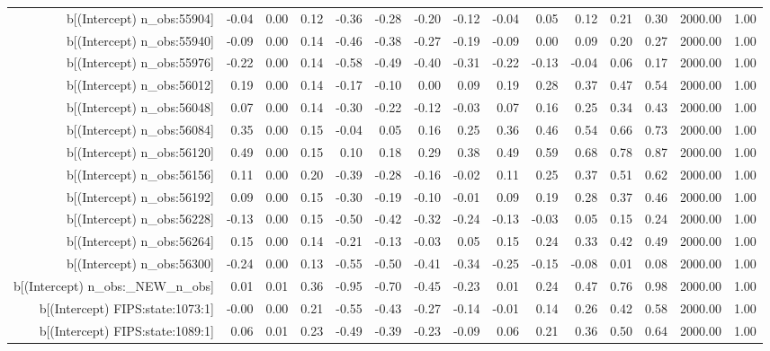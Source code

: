 \begin{table}[ht]
\begin{tabular}{rrrrrrrrrrrrrrr}
  b[(Intercept) n\_obs:55904] & -0.04 & 0.00 & 0.12 & -0.36 & -0.28 & -0.20 & -0.12 & -0.04 & 0.05 & 0.12 & 0.21 & 0.30 & 2000.00 & 1.00 \\ 
  b[(Intercept) n\_obs:55940] & -0.09 & 0.00 & 0.14 & -0.46 & -0.38 & -0.27 & -0.19 & -0.09 & 0.00 & 0.09 & 0.20 & 0.27 & 2000.00 & 1.00 \\ 
  b[(Intercept) n\_obs:55976] & -0.22 & 0.00 & 0.14 & -0.58 & -0.49 & -0.40 & -0.31 & -0.22 & -0.13 & -0.04 & 0.06 & 0.17 & 2000.00 & 1.00 \\ 
  b[(Intercept) n\_obs:56012] & 0.19 & 0.00 & 0.14 & -0.17 & -0.10 & 0.00 & 0.09 & 0.19 & 0.28 & 0.37 & 0.47 & 0.54 & 2000.00 & 1.00 \\ 
  b[(Intercept) n\_obs:56048] & 0.07 & 0.00 & 0.14 & -0.30 & -0.22 & -0.12 & -0.03 & 0.07 & 0.16 & 0.25 & 0.34 & 0.43 & 2000.00 & 1.00 \\ 
  b[(Intercept) n\_obs:56084] & 0.35 & 0.00 & 0.15 & -0.04 & 0.05 & 0.16 & 0.25 & 0.36 & 0.46 & 0.54 & 0.66 & 0.73 & 2000.00 & 1.00 \\ 
  b[(Intercept) n\_obs:56120] & 0.49 & 0.00 & 0.15 & 0.10 & 0.18 & 0.29 & 0.38 & 0.49 & 0.59 & 0.68 & 0.78 & 0.87 & 2000.00 & 1.00 \\ 
  b[(Intercept) n\_obs:56156] & 0.11 & 0.00 & 0.20 & -0.39 & -0.28 & -0.16 & -0.02 & 0.11 & 0.25 & 0.37 & 0.51 & 0.62 & 2000.00 & 1.00 \\ 
  b[(Intercept) n\_obs:56192] & 0.09 & 0.00 & 0.15 & -0.30 & -0.19 & -0.10 & -0.01 & 0.09 & 0.19 & 0.28 & 0.37 & 0.46 & 2000.00 & 1.00 \\ 
  b[(Intercept) n\_obs:56228] & -0.13 & 0.00 & 0.15 & -0.50 & -0.42 & -0.32 & -0.24 & -0.13 & -0.03 & 0.05 & 0.15 & 0.24 & 2000.00 & 1.00 \\ 
  b[(Intercept) n\_obs:56264] & 0.15 & 0.00 & 0.14 & -0.21 & -0.13 & -0.03 & 0.05 & 0.15 & 0.24 & 0.33 & 0.42 & 0.49 & 2000.00 & 1.00 \\ 
  b[(Intercept) n\_obs:56300] & -0.24 & 0.00 & 0.13 & -0.55 & -0.50 & -0.41 & -0.34 & -0.25 & -0.15 & -0.08 & 0.01 & 0.08 & 2000.00 & 1.00 \\ 
  b[(Intercept) n\_obs:\_NEW\_n\_obs] & 0.01 & 0.01 & 0.36 & -0.95 & -0.70 & -0.45 & -0.23 & 0.01 & 0.24 & 0.47 & 0.76 & 0.98 & 2000.00 & 1.00 \\ 
  b[(Intercept) FIPS:state:1073:1] & -0.00 & 0.00 & 0.21 & -0.55 & -0.43 & -0.27 & -0.14 & -0.01 & 0.14 & 0.26 & 0.42 & 0.58 & 2000.00 & 1.00 \\ 
  b[(Intercept) FIPS:state:1089:1] & 0.06 & 0.01 & 0.23 & -0.49 & -0.39 & -0.23 & -0.09 & 0.06 & 0.21 & 0.36 & 0.50 & 0.64 & 2000.00 & 1.00 \\ 

\end{tabular}
\end{table}
